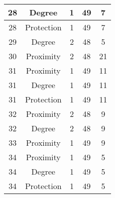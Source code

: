 \documentclass[results.tex]{subfiles}
\begin{document}
\begin{center}
\begin{tabular}{| c || c | c | c | c |}
            \hline
            28                      & Degree                       & 1                      & 49                      & 7                    \\
            \hline
            28                      & Protection                   & 1                      & 49                      & 7                    \\
            \hline
            29                      & Degree                       & 2                      & 48                      & 5                    \\
            \hline
            30                      & Proximity                    & 2                      & 48                      & 21                   \\
            \hline
            31                      & Proximity                    & 1                      & 49                      & 11                   \\
            \hline
            31                      & Degree                       & 1                      & 49                      & 11                   \\
            \hline
            31                      & Protection                   & 1                      & 49                      & 11                   \\
            \hline
            32                      & Proximity                    & 2                      & 48                      & 9                    \\
            \hline
            32                      & Degree                       & 2                      & 48                      & 9                    \\
            \hline
            33                      & Proximity                    & 1                      & 49                      & 9                    \\
            \hline
            34                      & Proximity                    & 1                      & 49                      & 5                    \\
            \hline
            34                      & Degree                       & 1                      & 49                      & 5                    \\
            \hline
            34                      & Protection                   & 1                      & 49                      & 5                    \\

\end{tabular}
\end{center}
\end{document}
